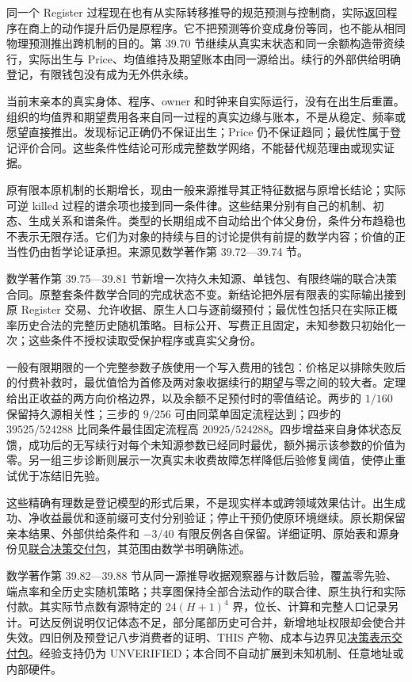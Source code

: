 \documentclass[
  11pt,
  oneside]{book}
\begin{document}
同一个 Register 过程现在也有从实际转移推导的规范预测与控制商，实际返回程序在商上的动作提升后仍是原程序。它不把预测等价变成身份等同，也不能从相同物理预测推出跨机制的目的。第 39.70 节继续从真实末状态和同一余额构造带资续行，实际出生与 Price、均值维持及期望账本由同一源给出。续行的外部供给明确登记，有限钱包没有成为无外供永续。

当前末亲本的真实身体、程序、owner 和时钟来自实际运行，没有在出生后重置。组织的均值界和期望费用各来自同一过程的真实边缘与账本，不是从稳定、频率或愿望直接推出。发现标记正确仍不保证出生；Price 仍不保证趋同；最优性属于登记评价合同。这些条件性结论可形成完整数学网络，不能替代规范理由或现实证据。

原有限本原机制的长期增长，现由一般来源推导其正特征数据与原增长结论；实际可逆 killed 过程的谱余项也接到同一条件律。这些结果分别有自己的机制、初态、生成关系和谱条件。类型的长期组成不自动给出个体父身份，条件分布趋稳也不表示无限存活。它们为对象的持续与目的讨论提供有前提的数学内容；价值的正当性仍由哲学论证承担。来源见数学著作第 39.72---39.74 节。

数学著作第 39.75---39.81 节新增一次持久未知源、单钱包、有限终端的联合决策合同。原整套条件数学合同的完成状态不变。新结论把外层有限表的实际输出接到原 Register 交易、允许收据、原生人口与逐前缀预付；最优性包括只在实际正概率历史合法的完整历史随机策略。目标公开、写费正且固定，未知参数只初始化一次；这些条件不授权读取受保护程序或真实父身份。

一般有限期限的一个完整参数子族使用一个写入费用的钱包：价格足以排除失败后的付费补救时，最优值恰为首修及两对象收据续行的期望与零之间的较大者。定理给出正收益的两方向价格边界，以及余额不足预付时的零值结论。两步的 \(1/160\) 保留持久源相关性；三步的 \(9/256\) 可由同菜单固定流程达到；四步的 \(39525/524288\) 比同条件最佳固定流程高 \(20925/524288\)。四步增益来自身体状态反馈，成功后的无写续行对每个未知源参数已经同时最优，额外揭示该参数的价值为零。另一组三步诊断则展示一次真实未收费故障怎样降低后验修复阈值，使停止重试优于冻结旧先验。

这些精确有理数是登记模型的形式后果，不是现实样本或跨领域效果估计。出生成功、净收益最优和逐前缀可支付分别验证；停止干预仍使原环境继续。原长期保留亲本结果、外部供给条件和 \(-3/40\) 有限反例各自保留。详细证明、原始表和源身份见\href{https://github.com/MurphyHoops/UEOT/blob/3d443ec29eb17af1fc00699a74e2d42d73516d81/formalization/ueot-core/docs/compression/theory_completion/unified_closure/joint_decision_closure_v1/README.md}{联合决策交付包}，其范围由数学书明确陈述。

数学著作第 39.82---39.88 节从同一源推导收据观察器与计数后验，覆盖零先验、端点率和全历史实随机策略；共享图保持全部合法动作的联合律、原生执行和实际付款。其实际节点数有源特定的 \(24(H+1)^4\) 界，位长、计算和完整人口记录另计。可达反例说明仅记体态不足，部分尾部历史可合并，新增地址权限却会使合并失效。四旧例及预登记八步消费者的证明、THIS 产物、成本与边界见\href{https://github.com/MurphyHoops/UEOT/blob/3d443ec29eb17af1fc00699a74e2d42d73516d81/formalization/ueot-core/docs/compression/theory_completion/unified_closure/decision_representation_closure_v1/README.md}{决策表示交付包}。经验支持仍为 UNVERIFIED；本合同不自动扩展到未知机制、任意地址或内部硬件。
\end{document}
